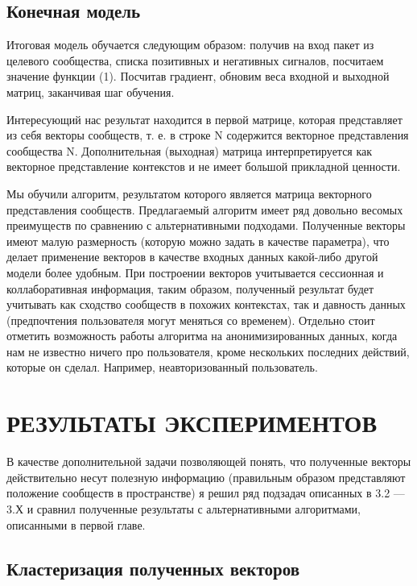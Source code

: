 \documentclass[times,specification,annotation]{itmo-student-thesis}
\begin{document}
\section{Конечная модель}

Итоговая модель обучается следующим образом: получив на вход пакет из
целевого сообщества, списка позитивных и негативных сигналов, посчитаем
значение функции (1). Посчитав градиент, обновим веса входной и выходной
матриц, заканчивая шаг обучения.

Интересующий нас результат находится в первой матрице, которая
представляет из себя векторы сообществ, т. е. в строке N содержится векторное
представления сообщества N. Дополнительная (выходная) матрица
интерпретируется как векторное представление контекстов и не имеет большой
прикладной ценности.

\chapterconclusion

Мы обучили алгоритм, результатом которого является матрица векторного
представления сообществ. Предлагаемый алгоритм имеет ряд довольно весомых
преимуществ по сравнению с альтернативными подходами. Полученные векторы
имеют малую размерность (которую можно задать в качестве параметра), что
делает применение векторов в качестве входных данных какой-либо другой
модели более удобным. При построении векторов учитывается сессионная и
коллаборативная информация, таким образом, полученный результат будет
учитывать как сходство сообществ в похожих контекстах, так и давность данных
(предпочтения пользователя могут меняться со временем). Отдельно стоит
отметить возможность работы алгоритма на анонимизированных данных, когда
нам не известно ничего про пользователя, кроме нескольких последних действий,
которые он сделал. Например, неавторизованный пользователь.

\chapter{РЕЗУЛЬТАТЫ ЭКСПЕРИМЕНТОВ}

В качестве дополнительной задачи позволяющей понять, что полученные
векторы действительно несут полезную информацию (правильным образом
представляют положение сообществ в пространстве) я решил ряд подзадач
описанных в 3.2 — 3.Х и сравнил полученные результаты с альтернативными
алгоритмами, описанными в первой главе.

\section{Кластеризация полученных векторов}
\end{document}
